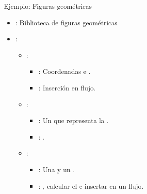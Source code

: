 \begin{frame}[t]{Ejemplo: Figuras geométricas}
\begin{itemize}
  \item {}: Biblioteca de figuras geométricas

  \item {}:
    \begin{itemize}
      \item {}: 
        \begin{itemize}
          \item {}: Coordenadas  e .
          \item {}: Inserción en flujo.
        \end{itemize}
      \item {}: 
        \begin{itemize}
          \item {}: Un  que representa la .
          \item {}: .
        \end{itemize}

      \item {}: 
        \begin{itemize}
          \item {}: Una  y un .
          \item {}: , calcular el 
                e insertar en un flujo.
        \end{itemize}
    \end{itemize}
\end{itemize}
\end{frame}


